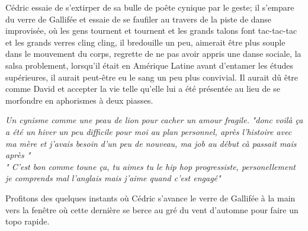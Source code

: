  \setlength{\columnsep}{4em}
\begin{paracol}{2}
Cédric essaie
de s'extirper de sa bulle de poête cynique par le geste; il s'empare du
verre de Gallifée et essaie de se faufiler au travers de la piste de danse
improvisée, où les gens tournent et tournent et les grands talons font
tac-tac-tac et les grands verres cling cling, il bredouille un peu, aimerait
être plus souple dans le mouvement du corps, regrette de ne pas avoir appris
une danse sociale, la salsa problement, lorsqu'il était en Amérique Latine
avant d'entamer les études supérieures, il aurait peut-être eu le sang un
peu plus convivial. Il aurait dû être comme David et accepter la vie telle
qu'elle lui a été présentée au lieu de se morfondre en aphorismes à deux
piasses. 

\emph{Un cynisme comme une peau de lion pour cacher un amour fragile.}  \switchcolumn
{} \phantom{}
\small
\textit{"\textelp{}donc voilà ça a été un hiver un peu difficile pour moi au
    plan personnel, après l'histoire avec ma mère et j'avais besoin d'un peu de
    nouveau, ma job au début cà passait mais après \textelp{}"\\[3em]
    "\textelp{} C'est bon comme toune ça, tu aimes tu le hip hop progressiste,
    personellement je comprends mal l'anglais mais j'aime quand c'est engagé"}
\end{paracol}
Profitons des quelques
instants où Cédric s'avance le verre de Gallifée à la main vers
la fenêtre où cette dernière se berce au gré du vent d'automne pour faire un topo
rapide. 
 \setlength{\columnsep}{4em}
